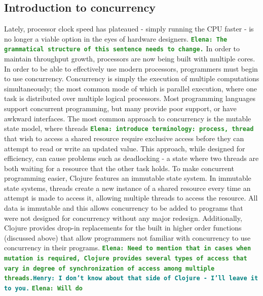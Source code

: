 \documentclass[12pt]{article}
\newcommand{\comment}[1]{{\bf \tt  {#1}}}
\newcommand{\emcomment}[1]{\textcolor{ForestGreen}{\comment{Elena: {#1}}}}
\newcommand{\hfcomment}[1]{\textcolor{Teal}{\comment{Henry: {#1}}}}
\begin{document}
\subsection{Introduction to concurrency}\label{sec:concurrency}
 Lately, processor clock speed has plateaued - simply running the CPU faster - is no longer a viable option in the eyes of hardware designers.
\emcomment{The grammatical structure of this sentence needs to change.}
In order to maintain throughput growth, processors are now being built with multiple cores. In order to be able to effectively use modern processors, programmers must begin to use concurrency. Concurrency is simply the execution of multiple computations simultaneously; the most common mode of which is parallel execution, where one task is distributed over multiple logical processors. Most programming languages support concurrent programming, but many provide poor support, or have awkward interfaces. The most common approach to concurrency is the mutable state model, where threads \emcomment{introduce terminology: process, thread} that wish to access a shared resource require exclusive access before they can attempt to read or write  an updated value. This approach, while designed for efficiency, can cause problems such as deadlocking - a state where two threads are both waiting for a resource that the other task holds. To make concurrent programming easier, Clojure features an immutable state system. In immutable state systems, threads create a new instance of a shared resource every time an attempt is made to access it, allowing multiple threads to access the resource. All data is immutable and this allows concurrency to be added to programs that were not designed for concurrency without any major redesign. Additionally, Clojure provides drop-in replacements for the built in higher order functions (discussed above) that allow programmers not familiar with concurrency to use concurrency in their programs.
\emcomment{Need to mention that in cases when mutation is required, Clojure provides several types of access that vary in degree of synchronization of access among multiple threads.}\hfcomment{I don't know about that side of Clojure - I'll leave it to you.}
\emcomment{Will do}
\end{document}
